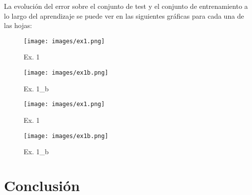 \documentclass{uc3mpracticas}
\begin{document}
La evolución del error sobre el conjunto de test y el conjunto de entrenamiento a lo largo del aprendizaje se puede ver en las siguientes gráficas para cada una de las hojas:

\begin{figure}[!h]
\centering
\begin{minipage}{.52\textwidth}
  \centering
  \texttt{[image: images/ex1.png]}
  \caption*{Ex. 1}
\end{minipage}%
\begin{minipage}{.52\textwidth}
  \centering
  \texttt{[image: images/ex1b.png]}
  \caption*{Ex. 1\_b}
\end{minipage}
\end{figure}


\begin{figure}[!h]
\centering
\begin{minipage}{.52\textwidth}
  \centering
  \texttt{[image: images/ex1.png]}
  \caption*{Ex. 1}
\end{minipage}%
\begin{minipage}{.52\textwidth}
  \centering
  \texttt{[image: images/ex1b.png]}
  \caption*{Ex. 1\_b}
\end{minipage}
\end{figure}






\section{Conclusión}
\end{document}
